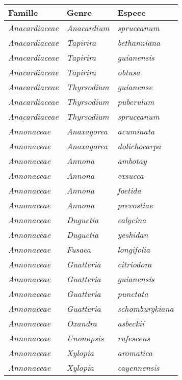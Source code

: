 \documentclass[fleqn,10pt]{ArtEcoFoG} %
\renewenvironment{table}{\begin{table*}}{\end{table*}\ignorespacesafterend}
\begin{document}
\begin{table}

\caption{\label{tab:Splist}Table S2: List of recruited species for all plots throughout the 30 years inventoried.}
\begin{tabular}[t]{lll}
\toprule
\textbf{Famille} & \textbf{Genre} & \textbf{Espece}\\
\midrule
\em{Anacardiaceae} & \em{Anacardium} & \em{spruceanum}\\
\em{Anacardiaceae} & \em{Tapirira} & \em{bethanniana}\\
\em{Anacardiaceae} & \em{Tapirira} & \em{guianensis}\\
\em{Anacardiaceae} & \em{Tapirira} & \em{obtusa}\\
\em{Anacardiaceae} & \em{Thyrsodium} & \em{guianense}\\
\addlinespace
\em{Anacardiaceae} & \em{Thyrsodium} & \em{puberulum}\\
\em{Anacardiaceae} & \em{Thyrsodium} & \em{spruceanum}\\
\em{Annonaceae} & \em{Anaxagorea} & \em{acuminata}\\
\em{Annonaceae} & \em{Anaxagorea} & \em{dolichocarpa}\\
\em{Annonaceae} & \em{Annona} & \em{ambotay}\\
\addlinespace
\em{Annonaceae} & \em{Annona} & \em{exsucca}\\
\em{Annonaceae} & \em{Annona} & \em{foetida}\\
\em{Annonaceae} & \em{Annona} & \em{prevostiae}\\
\em{Annonaceae} & \em{Duguetia} & \em{calycina}\\
\em{Annonaceae} & \em{Duguetia} & \em{yeshidan}\\
\addlinespace
\em{Annonaceae} & \em{Fusaea} & \em{longifolia}\\
\em{Annonaceae} & \em{Guatteria} & \em{citriodora}\\
\em{Annonaceae} & \em{Guatteria} & \em{guianensis}\\
\em{Annonaceae} & \em{Guatteria} & \em{punctata}\\
\em{Annonaceae} & \em{Guatteria} & \em{schomburgkiana}\\
\addlinespace
\em{Annonaceae} & \em{Oxandra} & \em{asbeckii}\\
\em{Annonaceae} & \em{Unonopsis} & \em{rufescens}\\
\em{Annonaceae} & \em{Xylopia} & \em{aromatica}\\
\em{Annonaceae} & \em{Xylopia} & \em{cayennensis}\\

\end{tabular}
\end{table}
\end{document}
